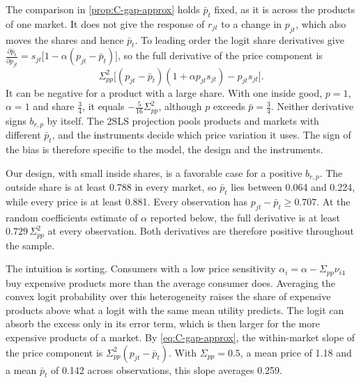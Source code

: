 The comparison in \cref{prop:C-gap-approx} holds $\bar p_t$ fixed, as it is across the products of one market. It does not
give the response of $r_{jt}$ to a change in $p_{jt}$, which also moves the shares and hence $\bar p_t$. To leading order
the logit share derivatives give $\frac{\partial\bar p_t}{\partial p_{jt}} = s_{jt}\big[1 - \alpha(p_{jt} - \bar p_t)\big]$,
so the full derivative of the price component is
\begin{equation*}
  \Sigma_{pp}^2\Big[(p_{jt} - \bar p_t)(1 + \alpha p_{jt}s_{jt}) - p_{jt}s_{jt}\Big] .
\end{equation*}
It can be negative for a product with a large share. With one inside good, $p = 1$, $\alpha = 1$ and share
$\frac{3}{4}$, it equals $-\frac{5}{16}\Sigma_{pp}^2$, although $p$ exceeds $\bar p = \frac{3}{4}$. Neither derivative
signs $b_{r,p}$ by itself. The 2SLS projection pools products and markets with different $\bar p_t$, and the instruments
decide which price variation it uses. The sign of the bias is therefore specific to the model, the design and the
instruments.

Our design, with small inside shares, is a favorable case for a positive $b_{r,p}$. The outside share is at least 0.788 in every market, so
$\bar p_t$ lies between 0.064 and 0.224, while every price is at least 0.881. Every observation has
$p_{jt} - \bar p_t \ge 0.707$. At the random coefficients estimate of $\alpha$ reported below, the full derivative is at
least $0.729\,\Sigma_{pp}^2$ at every observation. Both derivatives are therefore positive throughout the sample.

The intuition is sorting. Consumers with a low price sensitivity $\alpha_i = \alpha - \Sigma_{pp}\nu_{i4}$ buy expensive
products more than the average consumer does. Averaging the convex logit probability over this heterogeneity raises the
share of expensive products above what a logit with the same mean utility predicts. The logit can absorb the excess only
in its error term, which is then larger for the more expensive products of a market. By \eqref{eq:C-gap-approx}, the
within-market slope of the price component is $\Sigma_{pp}^2(p_{jt} - \bar p_t)$. With $\Sigma_{pp} = 0.5$, a mean price of
1.18 and a mean $\bar p_t$ of 0.142 across observations, this slope averages 0.259.

